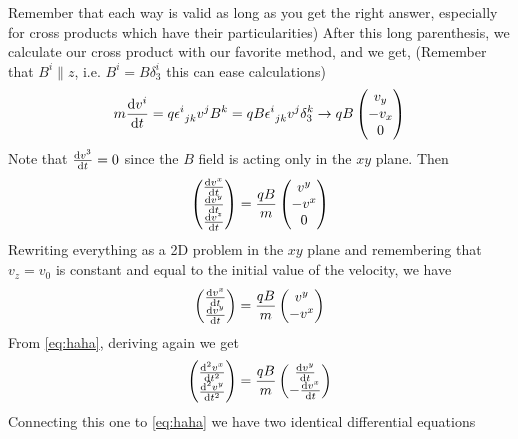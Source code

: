 \documentclass[../electromagnetism]{subfiles}
\begin{document}
Remember that each way is valid as long as you get the right answer, especially for cross products which have their particularities)
After this long parenthesis, we calculate our cross product with our favorite method, and we get, (Remember that $B^i\parallel z$, i.e. $B^i=B\delta^i_3$ this can ease calculations)
\begin{equation*}
	m\dv{v^i}{t}=q\epsilon^{i}_{\ jk}v^jB^k=qB\epsilon^{i}_{\ jk}v^j\delta^k_3\to qB\begin{pmatrix}v_y\\-v_x\\0\end{pmatrix}
\end{equation*}
Note that $\dv{v^3}{t}=0$ since the $B$ field is acting only in the $xy$ plane. Then
\begin{equation}
	\begin{pmatrix}
		\dv{v^x}{t}\\
		\dv{v^y}{t}\\
		\dv{v^z}{t}
	\end{pmatrix}=\frac{qB}{m}\begin{pmatrix}
		v^y\\
		-v^x\\
		0
	\end{pmatrix}
	\label{eq:matrixformlinearmotionB}
\end{equation}
Rewriting everything as a 2D problem in the $xy$ plane and remembering that $v_z=v_0$ is constant and equal to the initial value of the velocity, we have
\begin{equation}
	\begin{pmatrix}
		\dv{v^x}{t}\\
		\dv{v^y}{t}
	\end{pmatrix}=\frac{qB}{m}\begin{pmatrix}
		v^y\\
		-v^x
	\end{pmatrix}
	\label{eq:haha}
\end{equation}
From \eqref{eq:haha}, deriving again we get
\begin{equation*}
	\begin{pmatrix}
		\dv[2]{v^x}{t}\\
		\dv[2]{v^y}{t}
	\end{pmatrix}=\frac{qB}{m}\begin{pmatrix}
		\dv{v^y}{t}\\
		-\dv{v^x}{t}
	\end{pmatrix}
\end{equation*}
Connecting this one to \eqref{eq:haha} we have two identical differential equations
\end{document}
